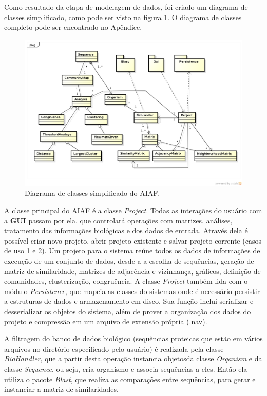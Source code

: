 Como resultado da etapa de modelagem de dados, foi criado um diagrama de classes simplificado, como pode ser visto na figura
\ref{fig:diagrama-classes-simplificado}. O diagrama de classes completo pode ser encontrado no Apêndice.

\begin{figure}
\centering
\includegraphics[scale=0.52]{diagrama-classes-simplificado}
\caption{Diagrama de classes simplificado do AIAF.}
\label{fig:diagrama-classes-simplificado}
\end{figure}

A classe principal do AIAF é a classe \textit{Project}. Todas as interações do usuário com a \textbf{GUI} passam por ela, que controlará operações com
matrizes, análises, tratamento das informações biológicas e dos dados de entrada. Através dela é possível criar novo projeto, abrir projeto existente e
salvar projeto corrente (casos de uso 1 e 2). Um projeto para o sistema reúne todos os dados de informações de execução de um conjunto de dados, desde a
a escolha de sequências, geração de matriz de similaridade, matrizes de adjacência e vizinhança, gráficos, definição de comunidades, clusterização,
congruência. A classe \textit{Project} também lida com o módulo \textit{Persistence}, que mapeia as classes do sistemas onde é necessário
persistir a estruturas de dados e armazenamento em disco. Sua função inclui serializar e desserializar os objetos do sistema, além de prover
a organização dos dados do projeto e compressão em um arquivo de extensão própria (.nav).


A filtragem do banco de dados biológico (sequências proteicas que estão em vários arquivos no diretório especificado pelo usuário) é realizada pela classe
\textit{BioHandler}, que a partir desta operação instancia objetosda classe \textit{Organism} e da classe \textit{Sequence}, ou seja, cria organismo e associa
sequências a eles. Então ela utiliza o pacote \textit{Blast}, que realiza as comparações entre sequências, para gerar e instanciar a matriz de similaridades.

